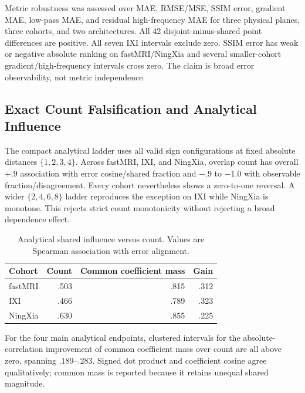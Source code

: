 Metric robustness was assessed over MAE, RMSE/MSE, SSIM error, gradient MAE, low-pass MAE, and residual high-frequency MAE for three physical planes, three cohorts, and two architectures. All 42 disjoint-minus-shared point differences are positive. All seven IXI intervals exclude zero. SSIM error has weak or negative absolute ranking on fastMRI/NingXia and several smaller-cohort gradient/high-frequency intervals cross zero. The claim is broad error observability, not metric independence.

\subsection{Exact Count Falsification and Analytical Influence}
The compact analytical ladder uses all valid sign configurations at fixed absolute distances $\{1,2,3,4\}$. Across fastMRI, IXI, and NingXia, overlap count has overall $+.9$ association with error cosine/shared fraction and $-.9$ to $-1.0$ with observable fraction/disagreement. Every cohort nevertheless shows a zero-to-one reversal. A wider $\{2,4,6,8\}$ ladder reproduces the exception on IXI while NingXia is monotone. This rejects strict count monotonicity without rejecting a broad dependence effect.

\begin{table}[t]
\centering
\caption{Analytical shared influence versus count. Values are Spearman association with error alignment.}
\label{tab:analytic}
\setlength{\tabcolsep}{5pt}
\begin{tabular}{lrrr}
\toprule
Cohort & Count & Common coefficient mass & Gain \\
\midrule
fastMRI & .503 & .815 & .312 \\
IXI & .466 & .789 & .323 \\
NingXia & .630 & .855 & .225 \\
\bottomrule
\end{tabular}
\end{table}

For the four main analytical endpoints, clustered intervals for the absolute-correlation improvement of common coefficient mass over count are all above zero, spanning .189--.283. Signed dot product and coefficient cosine agree qualitatively; common mass is reported because it retains unequal shared magnitude.

